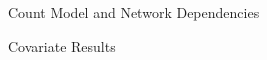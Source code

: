 \documentclass{beamer}
\begin{document}
\begin{frame}{Count Model and Network Dependencies}


\end{frame}



\begin{frame}{Covariate Results}


\end{frame}
\end{document}
